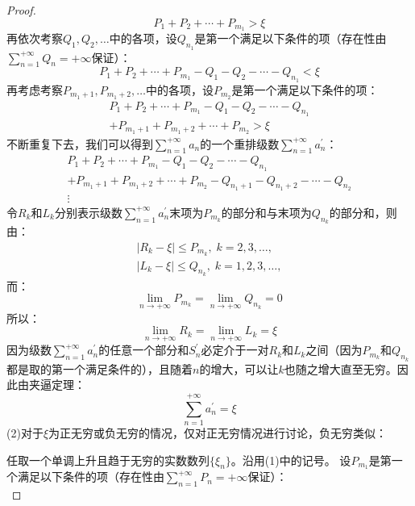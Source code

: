 \begin{proof}
	\begin{equation*}
		P_1+P_2+\cdots+P_{m_1}>\xi
	\end{equation*}
	再依次考察$Q_1,Q_2,\dots$中的各项，设$Q_{n_1}$是第一个满足以下条件的项（存在性由$\sum\limits_{n=1}^{+\infty}Q_n=+\infty$保证）：
	\begin{equation*}
		P_1+P_2+\cdots+P_{m_1}-Q_1-Q_2-\cdots-Q_{n_1}<\xi
	\end{equation*}
	再考虑考察$P_{m_1+1},P_{m_1+2},\dots$中的各项，设$P_{m_2}$是第一个满足以下条件的项：
	\begin{gather*}
		P_1+P_2+\cdots+P_{m_1}-Q_1-Q_2-\cdots-Q_{n_1} \\
		+P_{m_1+1}+P_{m_1+2}+\cdots+P_{m_2}>\xi
	\end{gather*}
	不断重复下去，我们可以得到$\sum\limits_{n=1}^{+\infty}a_n$的一个重排级数$\sum\limits_{n=1}^{+\infty}a^{'}_n$：
	\begin{gather*}
		P_1+P_2+\cdots+P_{m_1}-Q_1-Q_2-\cdots-Q_{n_1} \\
		+P_{m_1+1}+P_{m_1+2}+\cdots+P_{m_2}-Q_{n_1+1}-Q_{n_1+2}-\cdots-Q_{n_2} \\
		\vdots
	\end{gather*}
	令$R_k$和$L_k$分别表示级数$\sum\limits_{n=1}^{+\infty}a^{'}_n$末项为$P_{m_k}$的部分和与末项为$Q_{n_k}$的部分和，则由：
	\begin{gather*}
		|R_k-\xi|\leqslant P_{m_k},\;k=2,3,\dots, \\
		|L_k-\xi|\leqslant Q_{n_k},\;k=1,2,3,\dots,
	\end{gather*}
	而：
	\begin{equation*}
		\lim_{n\to+\infty}P_{m_k}=\lim_{n\to+\infty}Q_{n_k}=0
	\end{equation*}
	所以：
	\begin{equation*}
		\lim_{n\to+\infty}R_k=\lim_{n\to+\infty}L_k=\xi
	\end{equation*}
	因为级数$\sum\limits_{n=1}^{+\infty}a^{'}_n$的任意一个部分和$S^{'}_n$必定介于一对$R_k$和$L_k$之间（因为$P_{m_k}$和$Q_{n_k}$都是取的第一个满足条件的），且随着$n$的增大，可以让$k$也随之增大直至无穷。因此由夹逼定理：
	\begin{equation*}
		\sum_{n=1}^{+\infty}a^{'}_n=\xi
	\end{equation*}
	(2)对于$\xi$为正无穷或负无穷的情况，仅对正无穷情况进行讨论，负无穷类似：\par
	任取一个单调上升且趋于无穷的实数数列$\{\xi_n\}$。沿用(1)中的记号。
	设$P_{m_1}$是第一个满足以下条件的项（存在性由$\sum\limits_{n=1}^{+\infty}P_n=+\infty$保证）：
	\begin{equation*}

\end{equation*}
\end{proof}
